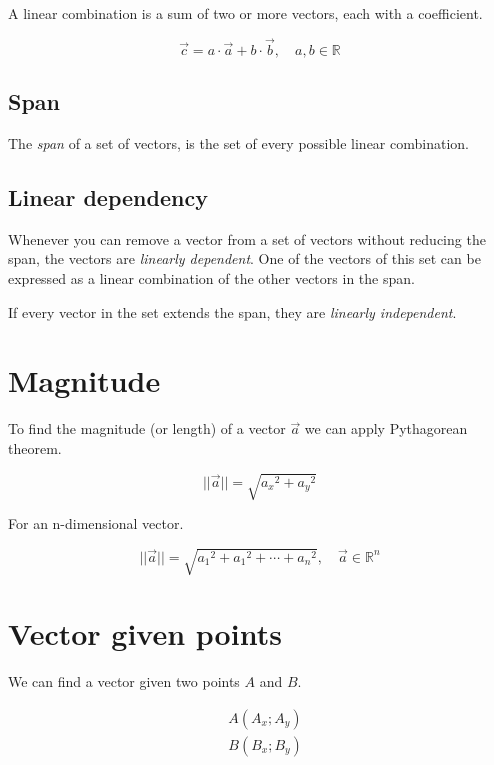 \documentclass{article}
\begin{document}
A linear combination is a sum of two or more vectors, each with a coefficient.

\[
    \vec{c} = a \cdot\vec{a} + b\cdot\vec{b},
    \quad a,b\in \mathbb{R}
\]

\subsection{Span}

The \textit{span} of a set of vectors, is the set of every possible linear combination.

\subsection{Linear dependency}

Whenever you can remove a vector from a set of vectors without reducing the span,
the vectors are \textit{linearly dependent}.
One of the vectors of this set can be expressed as a linear combination of the other vectors in the span.



If every vector in the set extends the span, they are \textit{linearly independent}.

\section{Magnitude}

To find the magnitude (or length) of a vector \(\vec{a}\) we can apply Pythagorean theorem.

\[
    ||\vec{a}|| = \sqrt{{a_x}^2 + {a_y}^2}
\]

For an n-dimensional vector.

\[
    ||\vec{a}|| = \sqrt{{a_1}^2 + {a_1}^2 + \cdots + {a_n}^2},
    \quad \vec{a}\in\mathbb{R}^n
\]

\section{Vector given points}

We can find a vector given two points \(A\) and \(B\).

\begin{align*}
    &A(A_x; A_y) \\
    &B(B_x; B_y)
\end{align*}
\end{document}

